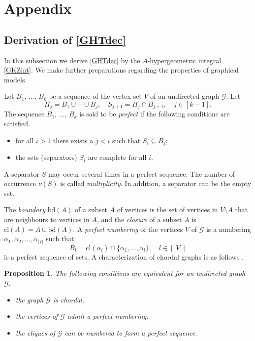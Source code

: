 \documentclass[a4paper,12pt]{article}
\theoremstyle{plain}
\newtheorem{proposition}[theorem]{Proposition}
\theoremstyle{remark}
\begin{document}
\section{Appendix}

\subsection{Derivation of \eqref{GHTdec}}

In this subsection we derive \eqref{GHTdec} by
the $A$-hypergeometric integral \eqref{GKZint}.
We make further preparations regarding the properties
of graphical models.

Let $B_1$, $\ldots$, $B_k$ be a sequence of the vertex set $V$
of an undirected graph $\mathcal{G}$. Let
\[
  H_j=B_1\cup\cdots\cup B_j,
  \quad S_{j+1}=H_j\cap B_{j+1}, \quad j \in [k-1]. 
\]
The sequence $B_1$, $\ldots$, $B_k$ is said to be {\it perfect}
if the following conditions are satisfied.
\begin{itemize}
  \item[(i)] for all $i>1$ there exists a $j<i$ such that
    $S_{i}\subseteq B_j$;
  \item[(ii)] the sets (separators) $S_i$ are complete for
    all $i$.
\end{itemize}
A separator $S$ may occur several times in a perfect sequence.
The number of occurrence $\nu(S)$ is called {\it multiplicity}.
In addition, a separator can be the empty set.

The {\it boundary} $\text{bd}(A)$ of a subset $A$ of vertices
is the set of vertices in $V\setminus A$ that are neighbours
to vertices in $A$, and the {\it closure} of a subset $A$ is
$\text{cl}(A)=A\cup\text{bd}(A)$. A {\it perfect numbering}
of the vertices $V$ of $\mathcal{G}$ is a numbering
$\alpha_1,\alpha_2,\ldots,\alpha_{|V|}$ such that
\[
  B_l=\text{cl}(\alpha_l)\cap\{\alpha_1,\ldots,\alpha_l\},
  \quad l\in [|V|]
\]
is a perfect sequence of sets. A characterization of chordal
graphs is as follows \cite[Proposition 2.17]{Lau94}.

\begin{proposition}\label{prop:perfect}
  The following conditions are equivalent for an undirected
  graph $\mathcal{G}$.
  \begin{itemize}
  \item[{\rm (i)}] the graph $\mathcal{G}$ is chordal.
  \item[{\rm (ii)}] the vertices of $\mathcal{G}$ admit
    a perfect numbering.
  \item[{\rm (ii)}] the cliques of $\mathcal{G}$ can be
    numbered to form a perfect sequence.
  \end{itemize}
\end{proposition}
\end{document}
